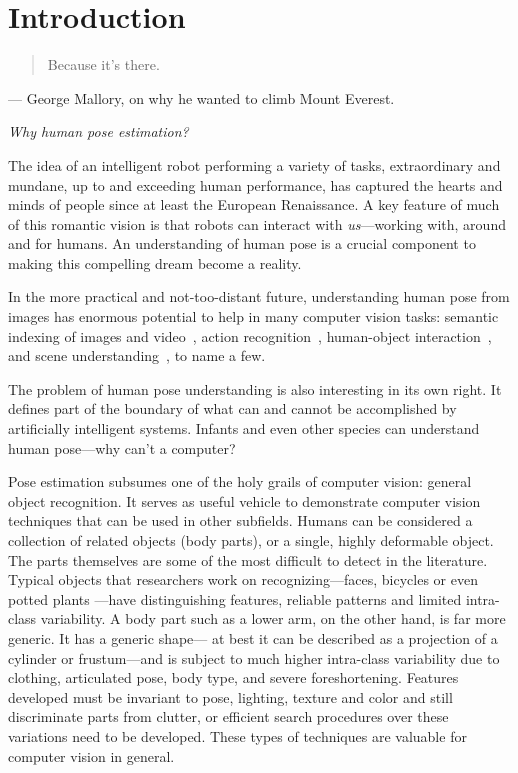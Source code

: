 \chapter{Introduction}
\begin{quote}
Because it's there.
\end{quote}
\hfill --- George Mallory, on why he wanted to climb Mount Everest.\\
\vspace{0.5in}

{\em Why human pose estimation? }

 The idea of an intelligent robot performing a variety of tasks, extraordinary 
and mundane, up to and exceeding human performance, has captured the hearts and 
minds of people since at least the European Renaissance.  A key feature of much 
of this romantic vision is that robots can interact with {\em us}---working 
with, around and for humans.  An understanding of human pose is a crucial 
component to making this compelling dream become a reality.  

In the more practical and not-too-distant future, understanding human pose from 
images has enormous potential to help in many computer vision tasks: semantic 
indexing of images and video~\citep{posesearch}, action 
recognition~\citep{pose-action11}, human-object interaction~\citep{bangpeng12}, 
and scene understanding~\citep{gupta11}, to name a few.   

The problem of human pose understanding is also interesting in its own right.  
It defines part of the boundary of what can and cannot be accomplished by 
artificially intelligent systems.  Infants and even other species can 
understand human pose---why can't a computer?  

Pose estimation subsumes one of the holy grails of computer vision: general 
object recognition.  It serves as useful vehicle to demonstrate computer vision 
techniques that can be used in other subfields.  Humans can be considered a 
collection of related objects (body parts), or a single, highly deformable 
object.  The parts themselves are some of the most difficult to detect in the 
literature.  Typical objects that researchers work on recognizing---faces, 
bicycles or even potted plants \citep{voc09}---have distinguishing features, 
reliable patterns and limited intra-class variability.  A body part such as a 
lower arm, on the other hand, is far more generic.  It has a generic shape---
at best it can be described as a projection of a cylinder or frustum---and is 
subject to much higher intra-class variability due to clothing, articulated 
pose, body type, and severe foreshortening.  Features developed must be 
invariant to pose, lighting, texture and color and still discriminate parts 
from clutter, or efficient search procedures over these variations need to be 
developed. These types of techniques are valuable for computer vision in 
general.

